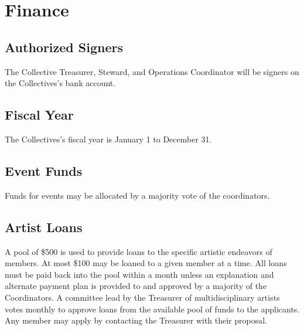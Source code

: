 \chapter{Finance}

\section{Authorized Signers}\label{sec:authorized_signers}
The Collective Treasurer, Steward, and Operations Coordinator will be signers on the Collectives's bank account.

\section{Fiscal Year}\label{sec:fiscal_year}
The Collectives's fiscal year is January 1 to December 31.

\section{Event Funds}\label{sec:event_funds}
Funds for events may be allocated by a majority vote of the coordinators.

\section{Artist Loans}\label{sec:artist_loans}
A pool of \$500 is used to provide loans to the specific artistic endeavors of members. At most \$100 may be loaned to a given member at a time. All loans must be paid back into the pool within a month unless an explanation and alternate payment plan is provided to and approved by a majority of the Coordinators. A committee lead by the Treasurer of multidisciplinary artists votes monthly to approve loans from the available pool of funds to the applicants. Any member may apply by contacting the Treasurer with their proposal.
